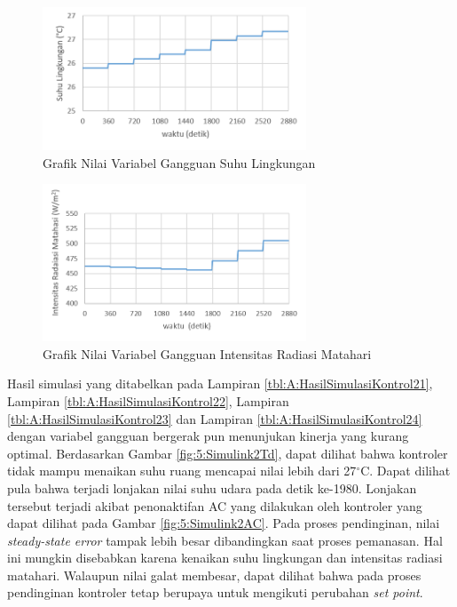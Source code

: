 \begin{figure}[!h]
	\centering
	\includegraphics[width=0.7\textwidth]{figures/Simulink2To}
	\caption{Grafik Nilai Variabel Gangguan Suhu Lingkungan}
	\label{fig:5:Simulink2To}
\end{figure}

\begin{figure}[!h]
	\centering
	\includegraphics[width=0.7\textwidth]{figures/Simulink2RD}
	\caption{Grafik Nilai Variabel Gangguan Intensitas Radiasi Matahari}
	\label{fig:5:Simulink2RD}
\end{figure}

Hasil simulasi yang ditabelkan pada Lampiran \ref{tbl:A:HasilSimulasiKontrol21}, Lampiran \ref{tbl:A:HasilSimulasiKontrol22}, Lampiran \ref{tbl:A:HasilSimulasiKontrol23} dan Lampiran \ref{tbl:A:HasilSimulasiKontrol24} dengan variabel gangguan bergerak pun menunjukan kinerja yang kurang optimal. Berdasarkan Gambar \ref{fig:5:Simulink2Td}, dapat dilihat bahwa kontroler tidak mampu menaikan suhu ruang mencapai nilai lebih dari 27$^\circ$C. Dapat dilihat pula bahwa terjadi lonjakan nilai suhu udara pada detik ke-1980. Lonjakan tersebut terjadi akibat penonaktifan AC yang dilakukan oleh kontroler yang dapat dilihat pada Gambar \ref{fig:5:Simulink2AC}. Pada proses pendinginan, nilai \textit{steady-state error} tampak lebih besar dibandingkan saat proses pemanasan. Hal ini mungkin disebabkan karena kenaikan suhu lingkungan dan intensitas radiasi matahari. Walaupun nilai galat membesar, dapat dilihat bahwa pada proses pendinginan kontroler tetap berupaya untuk mengikuti perubahan \textit{set point}.

